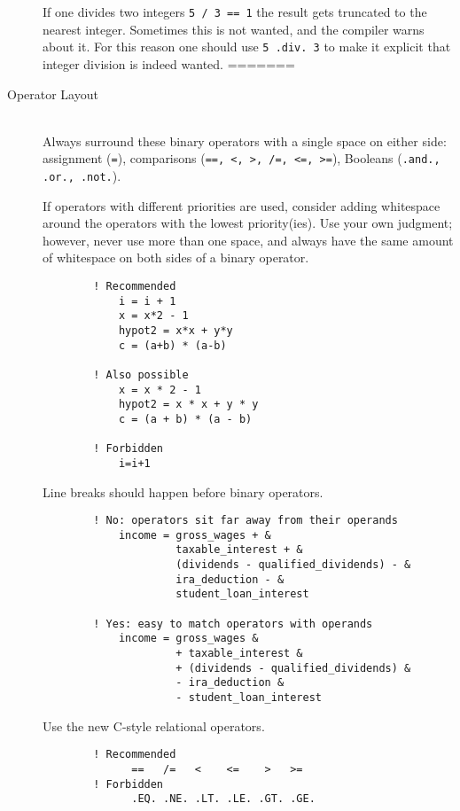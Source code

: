 \documentclass[a4paper,notitlepage]{scrreprt}
\newcommand\headitem[1]{\needspace{1.5\baselineskip}\item[{\boldmath #1 \nopagebreak}] \hfill \\ \nopagebreak}
\let\code\lstinline
\begin{document}
\begin{description}
    If one divides two integers \code{5 / 3 == 1} the result gets truncated
    to the nearest integer.
    Sometimes this is not wanted, and the compiler warns about it.
    For this reason one should use \code{5 .div. 3} to make it explicit
    that integer division is indeed wanted.
=======
    \headitem{Operator Layout}
        Always surround these binary operators with a single space on either side:
        assignment (\code{=}), comparisons (\code{==, <, >, /=, <=, >=}),
        Booleans (\code{.and., .or., .not.}).

        If operators with different priorities are used, consider adding
        whitespace around the operators with the lowest priority(ies).
        Use your own judgment; however, never use more than one space,
        and always have the same amount of whitespace on both sides
        of a binary operator.

        \begin{lstlisting}
        ! Recommended
            i = i + 1
            x = x*2 - 1
            hypot2 = x*x + y*y
            c = (a+b) * (a-b)

        ! Also possible
            x = x * 2 - 1
            hypot2 = x * x + y * y
            c = (a + b) * (a - b)

        ! Forbidden
            i=i+1
        \end{lstlisting}

        Line breaks should happen before binary operators.
        \begin{lstlisting}
        ! No: operators sit far away from their operands
            income = gross_wages + &
                     taxable_interest + &
                     (dividends - qualified_dividends) - &
                     ira_deduction - &
                     student_loan_interest

        ! Yes: easy to match operators with operands
            income = gross_wages &
                     + taxable_interest &
                     + (dividends - qualified_dividends) &
                     - ira_deduction &
                     - student_loan_interest
        \end{lstlisting}

        Use the new C-style relational operators.
        \begin{lstlisting}
        ! Recommended
              ==   /=   <    <=    >   >=
        ! Forbidden
              .EQ. .NE. .LT. .LE. .GT. .GE.
        \end{lstlisting}


\end{description}
\end{document}
